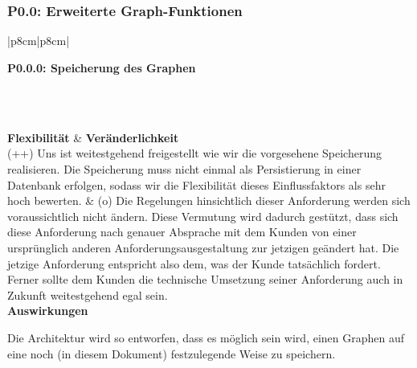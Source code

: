 \documentclass[enabledeprecatedfontcommands,fontsize=11pt,paper=a4,twoside]{scrartcl}
\newcounter{one}
\newcounter{two}[one]
\newcounter{three}[two]
\newcommand{\tone}{0\theone}
\newcommand{\ttwo}{0\thetwo}
\newcommand{\two}{\stepcounter{two}0\thetwo}
\newcommand{\three}{\stepcounter{three}0\thethree}
\begin{document}
\\ \\ %
\subsubsection*{\hypertarget{u}{P\tone.\two}: Erweiterte Graph-Funktionen}
\setcounter{three}{0}
\begin{tabular} {|p{8cm}|p{8cm}|}
	\hline
	 {\parbox{16cm}{\textbf{\hypertarget{v}{P\tone.\ttwo.\three}: Speicherung des Graphen}} }\\ \hline \hline
	\rule{0pt}{4ex}\\ [2ex] \hline
	\textbf{Flexibilität}  & \textbf{Veränderlichkeit} \\
	(++) Uns ist weitestgehend freigestellt wie wir die vorgesehene Speicherung realisieren. Die Speicherung muss nicht einmal als Persistierung in einer Datenbank erfolgen, sodass wir die Flexibilität dieses Einflussfaktors als sehr hoch bewerten. &
	(o) Die Regelungen hinsichtlich dieser Anforderung werden sich voraussichtlich nicht ändern. Diese Vermutung wird dadurch gestützt, dass sich diese Anforderung nach genauer Absprache mit dem Kunden von einer ursprünglich anderen Anforderungsausgestaltung zur jetzigen geändert hat. Die jetzige Anforderung entspricht also dem, was der Kunde tatsächlich fordert. Ferner sollte dem Kunden die technische Umsetzung seiner Anforderung auch in Zukunft weitestgehend egal sein. \\ \hline
	 {\textbf{Auswirkungen}} \\
	 {\parbox{16cm}{Die Architektur wird so entworfen, dass es möglich sein wird, einen Graphen auf eine noch (in diesem Dokument) festzulegende Weise zu speichern.} }\\ \hline
\end{tabular}
\\ \\ \\ \\ %
\end{document}
